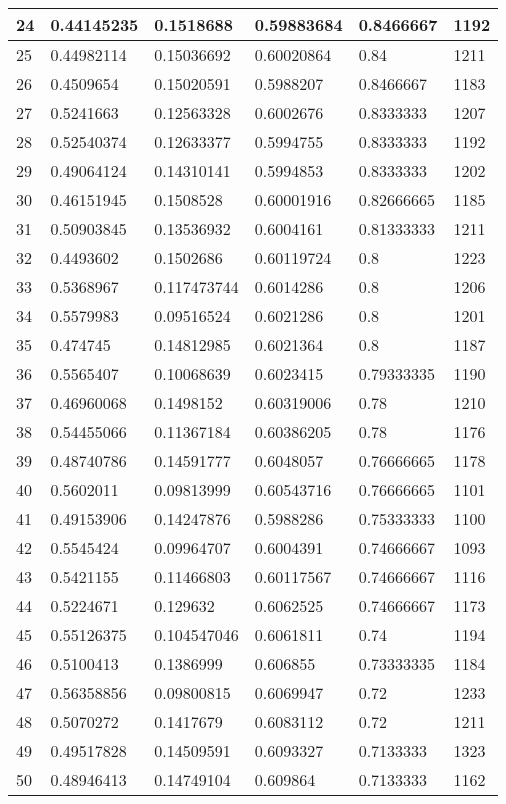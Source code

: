 \begin{longtable}{|l|l|l|l|l|l|}
24 & 0.44145235 & 0.1518688 & 0.59883684 & 0.8466667 & 1192 \\ \hline 
25 & 0.44982114 & 0.15036692 & 0.60020864 & 0.84 & 1211 \\ \hline 
26 & 0.4509654 & 0.15020591 & 0.5988207 & 0.8466667 & 1183 \\ \hline 
27 & 0.5241663 & 0.12563328 & 0.6002676 & 0.8333333 & 1207 \\ \hline 
28 & 0.52540374 & 0.12633377 & 0.5994755 & 0.8333333 & 1192 \\ \hline 
29 & 0.49064124 & 0.14310141 & 0.5994853 & 0.8333333 & 1202 \\ \hline 
30 & 0.46151945 & 0.1508528 & 0.60001916 & 0.82666665 & 1185 \\ \hline 
31 & 0.50903845 & 0.13536932 & 0.6004161 & 0.81333333 & 1211 \\ \hline 
32 & 0.4493602 & 0.1502686 & 0.60119724 & 0.8 & 1223 \\ \hline 
33 & 0.5368967 & 0.117473744 & 0.6014286 & 0.8 & 1206 \\ \hline 
34 & 0.5579983 & 0.09516524 & 0.6021286 & 0.8 & 1201 \\ \hline 
35 & 0.474745 & 0.14812985 & 0.6021364 & 0.8 & 1187 \\ \hline 
36 & 0.5565407 & 0.10068639 & 0.6023415 & 0.79333335 & 1190 \\ \hline 
37 & 0.46960068 & 0.1498152 & 0.60319006 & 0.78 & 1210 \\ \hline 
38 & 0.54455066 & 0.11367184 & 0.60386205 & 0.78 & 1176 \\ \hline 
39 & 0.48740786 & 0.14591777 & 0.6048057 & 0.76666665 & 1178 \\ \hline 
40 & 0.5602011 & 0.09813999 & 0.60543716 & 0.76666665 & 1101 \\ \hline 
41 & 0.49153906 & 0.14247876 & 0.5988286 & 0.75333333 & 1100 \\ \hline 
42 & 0.5545424 & 0.09964707 & 0.6004391 & 0.74666667 & 1093 \\ \hline 
43 & 0.5421155 & 0.11466803 & 0.60117567 & 0.74666667 & 1116 \\ \hline 
44 & 0.5224671 & 0.129632 & 0.6062525 & 0.74666667 & 1173 \\ \hline 
45 & 0.55126375 & 0.104547046 & 0.6061811 & 0.74 & 1194 \\ \hline 
46 & 0.5100413 & 0.1386999 & 0.606855 & 0.73333335 & 1184 \\ \hline 
47 & 0.56358856 & 0.09800815 & 0.6069947 & 0.72 & 1233 \\ \hline 
48 & 0.5070272 & 0.1417679 & 0.6083112 & 0.72 & 1211 \\ \hline 
49 & 0.49517828 & 0.14509591 & 0.6093327 & 0.7133333 & 1323 \\ \hline 
50 & 0.48946413 & 0.14749104 & 0.609864 & 0.7133333 & 1162 \\ \hline 
\end{longtable}